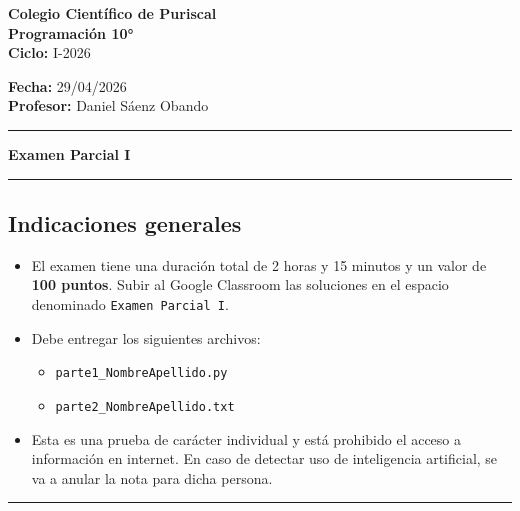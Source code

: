 \documentclass[letterpaper,12pt]{article}
\begin{document}
\AddToShipoutPicture{\BackgroundPic} %

\thispagestyle{firstpage}

\noindent
\begin{minipage}[t]{0.59\textwidth}
    \textbf{Colegio Científico de Puriscal} \\
    \textbf{Programación 10°} \\
    \textbf{Ciclo:} I-2026
\end{minipage}
\begin{minipage}[t]{0.4\textwidth}
    \raggedleft
    \textbf{Fecha:} 29/04/2026 \\
    \textbf{Profesor:} Daniel Sáenz Obando
\end{minipage}

\vspace{0.2cm}
\hrule
\vspace{0.1cm}

\begin{center}
	\Large \textbf{Examen Parcial I}
\end{center}

\vspace{0.1cm}
\hrule
\vspace{0.2cm}

\subsection*{Indicaciones generales}

\begin{itemize}
    \item El examen tiene una duración total de 2 horas y 15 minutos y un valor de \textbf{100 puntos}. Subir al Google Classroom las soluciones en el espacio denominado \texttt{Examen Parcial I}.
    \item Debe entregar los siguientes archivos: 
    \begin{itemize}
        \item \texttt{parte1\_NombreApellido.py}
        \item \texttt{parte2\_NombreApellido.txt}
    \end{itemize}
    \item Esta es una prueba de carácter individual y está prohibido el acceso a información en internet. En caso de detectar uso de inteligencia artificial, se va a anular la nota para dicha persona.
\end{itemize}

\hrule



\end{document}
